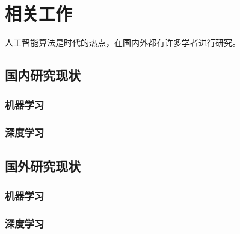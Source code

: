 
\chapter{相关工作}
人工智能算法是时代的热点，在国内外都有许多学者进行研究。
\section{国内研究现状}
\subsection{机器学习}
\subsection{深度学习}

\section{国外研究现状}
\subsection{机器学习}
\subsection{深度学习}